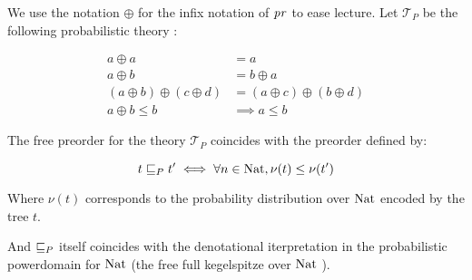 \begin{lemma}
    \label{lem:probpreo}
    We use the notation $\oplus$ for the infix notation 
    of $\operatorname{\mathit{pr}}$ to ease lecture.
    Let $\mathcal{T}_P$ be the following probabilistic theory 
    \cite{heckmann1994probabilistic}:

    \begin{equation*}
        \begin{array}{rl}
            a \oplus a &= a \\
            a \oplus b &= b \oplus a \\
            (a \oplus b) \oplus (c \oplus d) &= (a \oplus c) \oplus (b \oplus d) \\
            a \oplus b \leq b &\implies a \leq b
        \end{array}
    \end{equation*}

    The free preorder for the theory $\mathcal{T}_P$
    coincides with the preorder defined by:
    
    \begin{equation*}
        t \sqsubseteq_P t' \iff 
        \forall n \in \textnormal{Nat}, \nu (t) \leq \nu (t')
    \end{equation*}

    Where $\nu(t)$ corresponds to the probability distribution 
    over $\textnormal{Nat}$ encoded by the tree $t$.

    And $\sqsubseteq_P$ itself coincides with the denotational
    iterpretation in the probabilistic powerdomain for $\textnormal{Nat}$
    (the free full kegelspitze over $\textnormal{Nat}$ \cite{KeimelP2016}).

\end{lemma}

